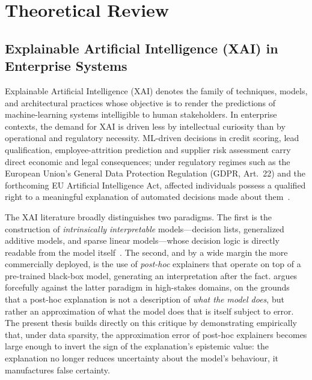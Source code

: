 \section{Theoretical Review}
\label{sec:lit-theory}

\subsection{Explainable Artificial Intelligence (XAI) in Enterprise Systems}
\label{subsec:xai-enterprise}

Explainable Artificial Intelligence (XAI) denotes the family of techniques,
models, and architectural practices whose objective is to render the
predictions of machine-learning systems intelligible to human stakeholders. In
enterprise contexts, the demand for XAI is driven less by intellectual
curiosity than by operational and regulatory necessity. ML-driven decisions in
credit scoring, lead qualification, employee-attrition prediction and supplier
risk assessment carry direct economic and legal consequences; under regulatory
regimes such as the European Union's General Data Protection Regulation (GDPR,
Art.~22) and the forthcoming EU Artificial Intelligence Act, affected
individuals possess a qualified right to a meaningful explanation of automated
decisions made about them~\citep{eu2024aiact}.

The XAI literature broadly distinguishes two paradigms. The first is the
construction of \emph{intrinsically interpretable} models---decision lists,
generalized additive models, and sparse linear models---whose decision logic is
directly readable from the model itself~\citep{rudin2019stop}. The second, and
by a wide margin the more commercially deployed, is the use of \emph{post-hoc}
explainers that operate on top of a pre-trained black-box model, generating an
interpretation after the fact. \citet{rudin2019stop} argues forcefully against
the latter paradigm in high-stakes domains, on the grounds that a post-hoc
explanation is not a description of \emph{what the model does}, but rather an
approximation of what the model does that is itself subject to error. The
present thesis builds directly on this critique by demonstrating empirically
that, under data sparsity, the approximation error of post-hoc explainers
becomes large enough to invert the sign of the explanation's epistemic value:
the explanation no longer reduces uncertainty about the model's behaviour, it
manufactures false certainty.

